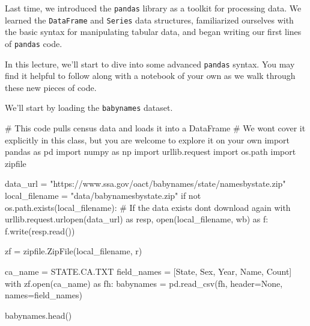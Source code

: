 \documentclass[
  letterpaper,
  DIV=11,
  numbers=noendperiod]{scrreprt}
\newenvironment{Shaded}{\begin{snugshade}}{\end{snugshade}}
\newcommand{\BuiltInTok}[1]{\textcolor[rgb]{0.00,0.23,0.31}{#1}}
\newcommand{\CommentTok}[1]{\textcolor[rgb]{0.37,0.37,0.37}{#1}}
\newcommand{\ControlFlowTok}[1]{\textcolor[rgb]{0.00,0.23,0.31}{#1}}
\newcommand{\ImportTok}[1]{\textcolor[rgb]{0.00,0.46,0.62}{#1}}
\newcommand{\KeywordTok}[1]{\textcolor[rgb]{0.00,0.23,0.31}{#1}}
\newcommand{\NormalTok}[1]{\textcolor[rgb]{0.00,0.23,0.31}{#1}}
\newcommand{\OperatorTok}[1]{\textcolor[rgb]{0.37,0.37,0.37}{#1}}
\newcommand{\StringTok}[1]{\textcolor[rgb]{0.13,0.47,0.30}{#1}}
\newcommand{\VariableTok}[1]{\textcolor[rgb]{0.07,0.07,0.07}{#1}}
\begin{document}
Last time, we introduced the \texttt{pandas} library as a toolkit for
processing data. We learned the \texttt{DataFrame} and \texttt{Series}
data structures, familiarized ourselves with the basic syntax for
manipulating tabular data, and began writing our first lines of
\texttt{pandas} code.

In this lecture, we'll start to dive into some advanced \texttt{pandas}
syntax. You may find it helpful to follow along with a notebook of your
own as we walk through these new pieces of code.

We'll start by loading the \texttt{babynames} dataset.

\begin{Shaded}
\begin{Highlighting}[]
\CommentTok{\# This code pulls census data and loads it into a DataFrame}
\CommentTok{\# We won\textquotesingle{}t cover it explicitly in this class, but you are welcome to explore it on your own}
\ImportTok{import}\NormalTok{ pandas }\ImportTok{as}\NormalTok{ pd}
\ImportTok{import}\NormalTok{ numpy }\ImportTok{as}\NormalTok{ np}
\ImportTok{import}\NormalTok{ urllib.request}
\ImportTok{import}\NormalTok{ os.path}
\ImportTok{import}\NormalTok{ zipfile}

\NormalTok{data\_url }\OperatorTok{=} \StringTok{"https://www.ssa.gov/oact/babynames/state/namesbystate.zip"}
\NormalTok{local\_filename }\OperatorTok{=} \StringTok{"data/babynamesbystate.zip"}
\ControlFlowTok{if} \KeywordTok{not}\NormalTok{ os.path.exists(local\_filename): }\CommentTok{\# If the data exists don\textquotesingle{}t download again}
    \ControlFlowTok{with}\NormalTok{ urllib.request.urlopen(data\_url) }\ImportTok{as}\NormalTok{ resp, }\BuiltInTok{open}\NormalTok{(local\_filename, }\StringTok{\textquotesingle{}wb\textquotesingle{}}\NormalTok{) }\ImportTok{as}\NormalTok{ f:}
\NormalTok{        f.write(resp.read())}

\NormalTok{zf }\OperatorTok{=}\NormalTok{ zipfile.ZipFile(local\_filename, }\StringTok{\textquotesingle{}r\textquotesingle{}}\NormalTok{)}

\NormalTok{ca\_name }\OperatorTok{=} \StringTok{\textquotesingle{}STATE.CA.TXT\textquotesingle{}}
\NormalTok{field\_names }\OperatorTok{=}\NormalTok{ [}\StringTok{\textquotesingle{}State\textquotesingle{}}\NormalTok{, }\StringTok{\textquotesingle{}Sex\textquotesingle{}}\NormalTok{, }\StringTok{\textquotesingle{}Year\textquotesingle{}}\NormalTok{, }\StringTok{\textquotesingle{}Name\textquotesingle{}}\NormalTok{, }\StringTok{\textquotesingle{}Count\textquotesingle{}}\NormalTok{]}
\ControlFlowTok{with}\NormalTok{ zf.}\BuiltInTok{open}\NormalTok{(ca\_name) }\ImportTok{as}\NormalTok{ fh:}
\NormalTok{    babynames }\OperatorTok{=}\NormalTok{ pd.read\_csv(fh, header}\OperatorTok{=}\VariableTok{None}\NormalTok{, names}\OperatorTok{=}\NormalTok{field\_names)}

\NormalTok{babynames.head()}
\end{Highlighting}
\end{Shaded}
\end{document}
